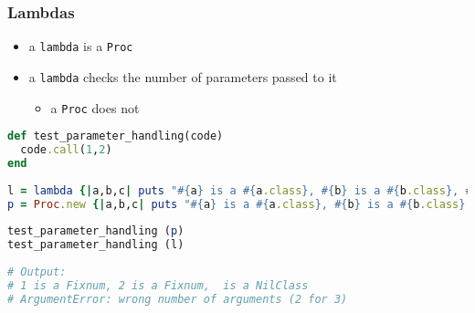 \begin{frame}[fragile]\frametitle{Lambdas}

\begin{itemize}

\item a \texttt{lambda} is a \texttt{Proc}

\item a \texttt{lambda} checks the number of parameters passed to it
\begin{itemize}
\item a \texttt{Proc} does not
\end{itemize}

\end{itemize}

\pause

\begin{lstlisting}[language=ruby]
def test_parameter_handling(code)
  code.call(1,2)
end
 
l = lambda {|a,b,c| puts "#{a} is a #{a.class}, #{b} is a #{b.class}, #{c} is a #{c.class}" }
p = Proc.new {|a,b,c| puts "#{a} is a #{a.class}, #{b} is a #{b.class}, #{c} is a #{c.class}" }
 
test_parameter_handling (p)
test_parameter_handling (l)
 
# Output:
# 1 is a Fixnum, 2 is a Fixnum,  is a NilClass
# ArgumentError: wrong number of arguments (2 for 3)
\end{lstlisting}

\end{frame}



